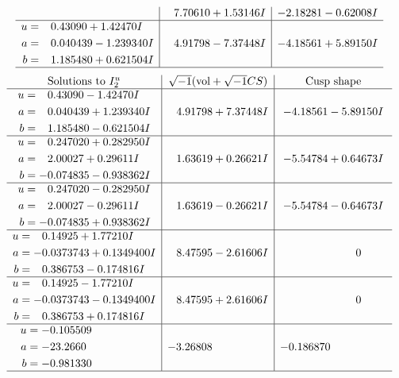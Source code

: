 \documentclass[1p]{elsarticle_modified}
\theoremstyle{definition}
\newcommand{\I}{\sqrt{-1}}
\begin{document}
$$\begin{array}{c|c|c}
 & \phantom{-}7.70610 + 1.53146 I & -2.18281 - 0.62008 I \\ \hline\begin{aligned}
u &= \phantom{-}0.43090 + 1.42470 I \\
a &= \phantom{-}0.040439 - 1.239340 I \\
b &= \phantom{-}1.185480 + 0.621504 I\end{aligned}
 & \phantom{-}4.91798 - 7.37448 I & -4.18561 + 5.89150 I\\
 \hline 
 \end{array}$$\newpage$$\begin{array}{c|c|c}  
\text{Solutions to }I^u_{2}& \I (\text{vol} + \sqrt{-1}CS) & \text{Cusp shape}\\
 \hline 
\begin{aligned}
u &= \phantom{-}0.43090 - 1.42470 I \\
a &= \phantom{-}0.040439 + 1.239340 I \\
b &= \phantom{-}1.185480 - 0.621504 I\end{aligned}
 & \phantom{-}4.91798 + 7.37448 I & -4.18561 - 5.89150 I \\ \hline\begin{aligned}
u &= \phantom{-}0.247020 + 0.282950 I \\
a &= \phantom{-}2.00027 + 0.29611 I \\
b &= -0.074835 - 0.938362 I\end{aligned}
 & \phantom{-}1.63619 + 0.26621 I & -5.54784 + 0.64673 I \\ \hline\begin{aligned}
u &= \phantom{-}0.247020 - 0.282950 I \\
a &= \phantom{-}2.00027 - 0.29611 I \\
b &= -0.074835 + 0.938362 I\end{aligned}
 & \phantom{-}1.63619 - 0.26621 I & -5.54784 - 0.64673 I \\ \hline\begin{aligned}
u &= \phantom{-}0.14925 + 1.77210 I \\
a &= -0.0373743 + 0.1349400 I \\
b &= \phantom{-}0.386753 - 0.174816 I\end{aligned}
 & \phantom{-}8.47595 - 2.61606 I & \phantom{-0.000000 } 0 \\ \hline\begin{aligned}
u &= \phantom{-}0.14925 - 1.77210 I \\
a &= -0.0373743 - 0.1349400 I \\
b &= \phantom{-}0.386753 + 0.174816 I\end{aligned}
 & \phantom{-}8.47595 + 2.61606 I & \phantom{-0.000000 } 0 \\ \hline\begin{aligned}
u &= -0.105509\phantom{ +0.000000I} \\
a &= -23.2660\phantom{ +0.000000I} \\
b &= -0.981330\phantom{ +0.000000I}\end{aligned}
 & -3.26808\phantom{ +0.000000I} & -0.186870\phantom{ +0.000000I}\\
 \hline 
 \end{array}$$\newpage\newpage\renewcommand{\arraystretch}{1}
\end{document}
